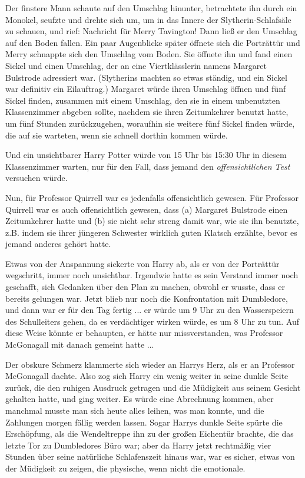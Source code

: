 Der finstere Mann schaute auf den Umschlag hinunter, betrachtete ihn durch ein
Monokel, seufzte und drehte sich um, um in das Innere der Slytherin-Schlafsäle
zu schauen, und rief: \glqq{}Nachricht für Merry Tavington!\grqq{} Dann ließ er
den Umschlag auf den Boden fallen. Ein paar Augenblicke später öffnete sich die
Porträttür und Merry schnappte sich den Umschlag vom Boden. Sie öffnete ihn und
fand einen Sickel und einen Umschlag, der an eine Viertklässlerin namens
Margaret Bulstrode adressiert war. (Slytherins machten so etwas ständig, und ein
Sickel war definitiv ein Eilauftrag.) Margaret würde ihren Umschlag öffnen und
fünf Sickel finden, zusammen mit einem Umschlag, den sie in einem unbenutzten
Klassenzimmer abgeben sollte, nachdem sie ihren Zeitumkehrer benutzt hatte, um
fünf Stunden zurückzugehen, woraufhin sie weitere fünf Sickel finden würde, die
auf sie warteten, wenn sie schnell dorthin kommen würde.

Und ein unsichtbarer Harry Potter würde von 15 Uhr bis 15:30 Uhr in diesem
Klassenzimmer warten, nur für den Fall, dass jemand den \emph{offensichtlichen
Test} versuchen würde.

Nun, für Professor Quirrell war es jedenfalls offensichtlich gewesen. Für
Professor Quirrell war es auch offensichtlich gewesen, dass (a) Margaret
Bulstrode einen Zeitumkehrer hatte und (b) sie nicht sehr streng damit war, wie
sie ihn benutzte, z.B. indem sie ihrer jüngeren Schwester wirklich guten Klatsch
erzählte, \glqq{}bevor\grqq{} es jemand anderes gehört hatte.

Etwas von der Anspannung sickerte von Harry ab, als er von der Porträttür
wegschritt, immer noch unsichtbar. Irgendwie hatte es sein Verstand immer noch
geschafft, sich Gedanken über den Plan zu machen, obwohl er wusste, dass er
bereits gelungen war. Jetzt blieb nur noch die Konfrontation mit Dumbledore, und
dann war er für den Tag fertig ... er würde um 9 Uhr zu den Wasserspeiern des
Schulleiters gehen, da es verdächtiger wirken würde, es um 8 Uhr zu tun. Auf
diese Weise könnte er behaupten, er hätte nur missverstanden, was Professor
McGonagall mit \glqq{}danach\grqq{} gemeint hatte ...

Der obskure Schmerz klammerte sich wieder an Harrys Herz, als er an Professor
McGonagall dachte. Also zog sich Harry ein wenig weiter in seine dunkle Seite
zurück, die den ruhigen Ausdruck getragen und die Müdigkeit aus seinem Gesicht
gehalten hatte, und ging weiter. Es würde eine Abrechnung kommen, aber manchmal
musste man sich heute alles leihen, was man konnte, und die Zahlungen morgen
fällig werden lassen. Sogar Harrys dunkle Seite spürte die Erschöpfung, als die
Wendeltreppe ihn zu der großen Eichentür brachte, die das letzte Tor zu
Dumbledores Büro war; aber da Harry jetzt rechtmäßig vier Stunden über seine
natürliche Schlafenszeit hinaus war, war es sicher, etwas von der Müdigkeit zu
zeigen, die physische, wenn nicht die emotionale.

